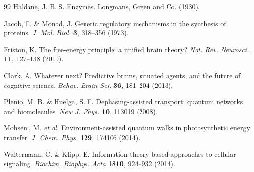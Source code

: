 \documentclass{article}
\theoremstyle{definition}
\theoremstyle{remark}
\begin{document}
\begin{thebibliography}{99}
Haldane, J. B. S.
\newblock Enzymes.
\newblock Longmans, Green and Co. (1930).

Jacob, F. \& Monod, J.
\newblock Genetic regulatory mechanisms in the synthesis of proteins.
\newblock \emph{J. Mol. Biol.} \textbf{3}, 318--356 (1973).

Friston, K.
\newblock The free-energy principle: a unified brain theory?
\newblock \emph{Nat. Rev. Neurosci.} \textbf{11}, 127--138 (2010).

Clark, A.
\newblock Whatever next? Predictive brains, situated agents, and the future of cognitive science.
\newblock \emph{Behav. Brain Sci.} \textbf{36}, 181--204 (2013).

Plenio, M. B. \& Huelga, S. F.
\newblock Dephasing-assisted transport: quantum networks and biomolecules.
\newblock \emph{New J. Phys.} \textbf{10}, 113019 (2008).

Mohseni, M. \emph{et al.}
\newblock Environment-assisted quantum walks in photosynthetic energy transfer.
\newblock \emph{J. Chem. Phys.} \textbf{129}, 174106 (2014).

Waltermann, C. \& Klipp, E.
\newblock Information theory based approaches to cellular signaling.
\newblock \emph{Biochim. Biophys. Acta} \textbf{1810}, 924--932 (2014).

\end{thebibliography}
\end{document}
